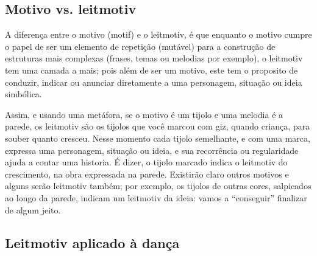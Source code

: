 \subsection{Motivo vs. leitmotiv}
A diferença entre o motivo (motif) e o leitmotiv, 
é que  enquanto o motivo cumpre o papel de ser um elemento de repetição (mutável)
para a construção de estruturas mais complexas (frases, temas ou melodias por exemplo),
o leitmotiv tem uma camada a mais; pois além de ser um motivo, 
este tem o proposito de conduzir, indicar ou anunciar diretamente
a uma personagem, situação ou ideia simbólica.

Assim, e usando uma metáfora, se o motivo é um tijolo e uma melodia é a parede, 
os leitmotiv são os tijolos que  você marcou com giz, quando criança, para souber quanto cresceu.
Nesse momento cada tijolo semelhante, e com uma marca, expressa uma personagem, situação ou ideia,
e sua recorrência ou regularidade ajuda a contar uma historia.
É dizer, o tijolo marcado indica o leitmotiv do crescimento, na obra expressada na parede.
Existirão claro outros motivos e alguns serão leitmotiv também; por exemplo, os tijolos de outras cores,
salpicados ao longo da parede, indicam um leitmotiv da ideia: vamos  a ``conseguir'' finalizar de algum jeito.



\subsection{Leitmotiv aplicado à dança}

